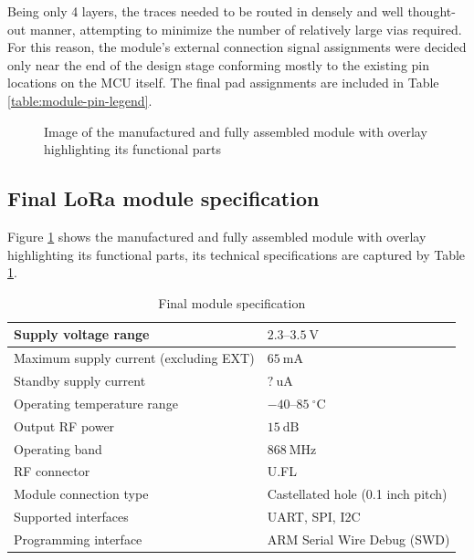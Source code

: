 Being only 4 layers, the traces needed to be routed in densely and well thought-out manner, attempting to minimize the number of relatively large vias required. For this reason, the module's external connection signal assignments were decided only near the end of the design stage conforming mostly to the existing pin locations on the MCU itself. The final pad assignments are included in Table \ref{table:module-pin-legend}.

\begin{figure}
    
    \caption{\label{fig:module-v0.1}Image of the manufactured and fully assembled module with overlay highlighting its functional parts}
\end{figure}

\subsection{Final LoRa module specification}
Figure \ref{fig:module-v0.1} shows the manufactured and fully assembled module with overlay highlighting its functional parts, its technical specifications are captured by Table \ref{table:module-specification}.

\begin{table}[p]
\begin{center}
\caption{\label{table:module-specification}Final module specification}
    \begin{tabular}{|l|l|} \hline
    Supply voltage range                    & $2.3\text{--}3.5~\mathrm{V}$\\ \hline
    Maximum supply current (excluding EXT)  & $65~\mathrm{mA}$\\ \hline
    Standby supply current                  & $?~\mathrm{uA}$\\ \hline
    Operating temperature range             & $-40\text{--}85~\mathrm{^\circ C}$\\ \hline
    Output RF power                         & $15~\mathrm{dB}$\\ \hline
    Operating band                          & $868~\mathrm{MHz}$\\ \hline
    RF connector                            & U.FL \\ \hline
    Module connection type                  & Castellated hole (0.1 inch pitch) \\ \hline
    Supported interfaces                    & UART, SPI, I2C \\ \hline
    Programming interface                   & ARM Serial Wire Debug (SWD) \\ \hline
    \end{tabular}
\end{center}
\end{table}

